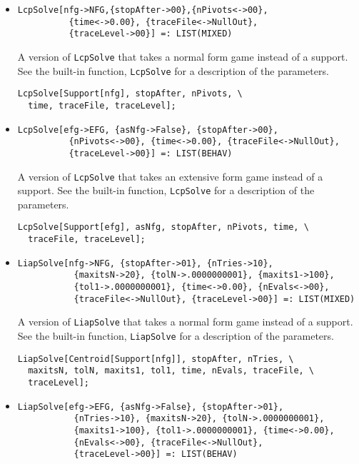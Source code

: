 \begin{itemize}
\item{}
\protect \large \begin{verbatim}
LcpSolve[nfg->NFG,{stopAfter->00},{nPivots<->00}, 
          {time<->0.00}, {traceFile<->NullOut}, 
          {traceLevel->00}] =: LIST(MIXED)
\end{verbatim}\normalsize

\bd 
A version of \verb+LcpSolve+ that takes a normal form
game instead of a support.  See the built-in function,
\verb+LcpSolve+ for a description of the parameters.
\begin{verbatim}
LcpSolve[Support[nfg], stopAfter, nPivots, \
  time, traceFile, traceLevel];
\end{verbatim} 
\ed

\item{}
\protect \large \begin{verbatim}
LcpSolve[efg->EFG, {asNfg->False}, {stopAfter->00}, 
          {nPivots<->00}, {time<->0.00}, {traceFile<->NullOut}, 
          {traceLevel->00}] =: LIST(BEHAV)
\end{verbatim}\normalsize

\bd 
A version of \verb+LcpSolve+ that takes an extensive form
game instead of a support.  See the built-in function,
\verb+LcpSolve+ for a description of the parameters.
\begin{verbatim}
LcpSolve[Support[efg], asNfg, stopAfter, nPivots, time, \
  traceFile, traceLevel];
\end{verbatim} 
\ed

\item{}
\protect \large \begin{verbatim}
LiapSolve[nfg->NFG, {stopAfter->01}, {nTries->10}, 
           {maxitsN->20}, {tolN->.0000000001}, {maxits1->100}, 
           {tol1->.0000000001}, {time<->0.00}, {nEvals<->00},
           {traceFile<->NullOut}, {traceLevel->00}] =: LIST(MIXED)
\end{verbatim}\normalsize

\bd 
A version of \verb+LiapSolve+ that takes a normal form
game instead of a support.  See the built-in function,
\verb+LiapSolve+ for a description of the parameters.
\begin{verbatim}
LiapSolve[Centroid[Support[nfg]], stopAfter, nTries, \
  maxitsN, tolN, maxits1, tol1, time, nEvals, traceFile, \
  traceLevel];
\end{verbatim} 
\ed

\item{}
\protect \large \begin{verbatim}
LiapSolve[efg->EFG, {asNfg->False}, {stopAfter->01}, 
           {nTries->10}, {maxitsN->20}, {tolN->.0000000001}, 
           {maxits1->100}, {tol1->.0000000001}, {time<->0.00}, 
           {nEvals<->00}, {traceFile<->NullOut}, 
           {traceLevel->00}] =: LIST(BEHAV)
\end{verbatim}\normalsize


\end{itemize}
